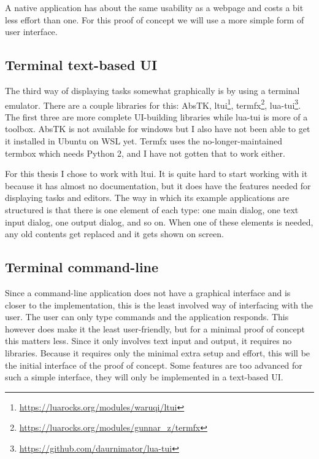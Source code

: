 A native application has about the same usability as a webpage and costs a bit less effort than one. For this proof of concept we will use a more simple form of user interface.

\subsection{Terminal text-based UI}
The third way of displaying tasks somewhat graphically is by using a terminal emulator. There are a couple libraries for this:
AbsTK,
ltui\footnote{\url{https://luarocks.org/modules/waruqi/ltui}},
termfx\footnote{\url{https://luarocks.org/modules/gunnar_z/termfx}},
lua-tui\footnote{\url{https://github.com/daurnimator/lua-tui}}. The first three are more complete UI-building libraries while lua-tui is more of a toolbox. AbsTK is not available for windows but I also have not been able to get it installed in Ubuntu on WSL yet. Termfx uses the no-longer-maintained termbox which needs Python 2, and I have not gotten that to work either.

For this thesis I chose to work with ltui. It is quite hard to start working with it because it has almost no documentation, but it does have the features needed for displaying tasks and editors. The way in which its example applications are structured is that there is one element of each type: one main dialog, one text input dialog, one output dialog, and so on. When one of these elements is needed, any old contents get replaced and it gets shown on screen.

\subsection{Terminal command-line}
Since a command-line application does not have a graphical interface and is closer to the implementation, this is the least involved way of interfacing with the user. The user can only type commands and the application responds. This however does make it the least user-friendly, but for a minimal proof of concept this matters less. Since it only involves text input and output, it requires no libraries. Because it requires only the minimal extra setup and effort, this will be the initial interface of the proof of concept. Some features are too advanced for such a simple interface, they will only be implemented in a text-based UI.
